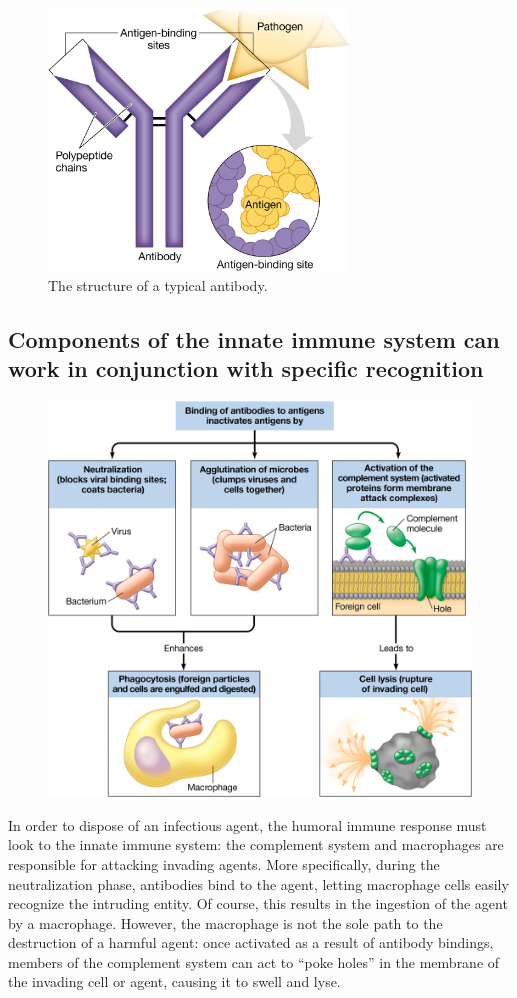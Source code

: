 \documentclass{article}
\begin{document}
\begin{figure}[h]
	\centering
	\includegraphics[width=8cm]{antibody_structure.png}
	\caption{The structure of a typical antibody.}
\end{figure}

\subsection{Components of the innate immune system can work in conjunction with specific recognition}

\begin{figure}
	\centering
	\includegraphics[width=0.7\linewidth]{innate_destruction.png}
\end{figure}

In order to dispose of an infectious agent, the humoral immune response must
look to the innate immune system: the complement system and macrophages are
responsible for attacking invading agents. More specifically, during the
neutralization phase, antibodies bind to the agent, letting macrophage cells
easily recognize the intruding entity. Of course, this results in the ingestion
of the agent by a macrophage. However, the macrophage is not the sole path to
the destruction of a harmful agent: once activated as a result of antibody
bindings, members of the complement system can act to ``poke holes'' in the
membrane of the invading cell or agent, causing it to swell and lyse.
\end{document}
